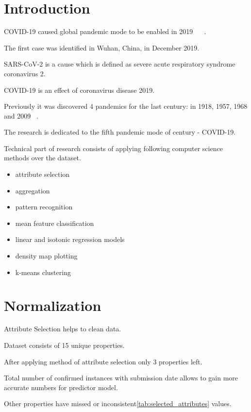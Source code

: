 
\section{Introduction}
\label{sec:introduction}

COVID-19 caused global pandemic mode to be enabled in 2019 ~\cite{covid-wiki} ~\cite{arxiv-2009.12325}.

The first case was identified in Wuhan, China, in December 2019.

SARS-CoV-2 is a cause which is defined as severe acute respiratory syndrome coronavirus 2.

COVID-19 is an effect of coronavirus disease 2019.

Previously it was discovered 4 pandemics for the last century: in 1918, 1957, 1968 and 2009 ~\cite{cdc-pastpandemics}.

The research is dedicated to the fifth pandemic mode of century - COVID-19.

Technical part of research consists of applying following computer science methods over the \dbName{} dataset.

\begin{itemize}
    \item attribute selection
    \item aggregation
    \item pattern recognition
    \item mean feature classification
    \item linear and isotonic regression models
    \item density map plotting
    \item k-means clustering
\end{itemize}


\section{Normalization}
\label{sec:normalization}

Attribute Selection helps to clean data.

Dataset consists of 15 unique properties.

After applying method of attribute selection only 3 properties left.

Total number of confirmed instances with submission date allows to gain more accurate numbers for predictor model.

Other properties have missed or inconsistent\ref{tab:selected_attributes} values.

